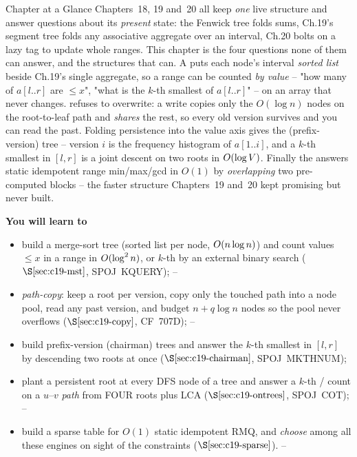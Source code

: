 \begin{chaptertheorybox}{Chapter at a Glance}
Chapters~18, 19 and~20 all keep \emph{one} live structure and answer questions
about its \emph{present} state: the Fenwick tree folds sums, Ch.19's segment
tree folds any associative aggregate over an interval, Ch.20 bolts on a lazy
tag to update whole ranges.  This chapter is the four questions none of them
can answer, and the structures that can.  A  puts each
node's interval \emph{sorted list} beside Ch.19's single aggregate, so a range
can be counted \emph{by value} -- "how many of \(a[l..r]\) are \(\le x\)",
"what is the \(k\)-th smallest of \(a[l..r]\)" -- on an array that never
changes.   refuses to overwrite: a write
copies only the \(O(\log n)\) nodes on the root-to-leaf path and \emph{shares}
the rest, so every old version survives and you can read the past.  Folding
persistence into the value axis gives the  (prefix-version) tree
-- version \(i\) is the frequency histogram of \(a[1..i]\), and a \(k\)-th
smallest in \([l,r]\) is a joint descent on two roots in \(O(\log V)\).
Finally the  answers static idempotent range min/max/gcd in
\(O(1)\) by \emph{overlapping} two pre-computed blocks -- the faster structure
Chapters~19 and~20 kept promising but never built.

\textbf{You will learn to}
\begin{itemize}[nosep]
  \item build a merge-sort tree (sorted list per node, \(O(n\log n)\)) and
        count values \(\le x\) in a range in \(O(\log^2 n)\), or \(k\)-th
        by an external binary search (\(\secref{c19-mst}\), SPOJ~KQUERY); \hfill{}--
  \item \emph{path-copy}: keep a root per version, copy only the touched path
        into a node pool, read any past version, and budget
        \(n+q\log n\) nodes so the pool never overflows
        (\(\secref{c19-copy}\), CF~707D); \hfill{}--
  \item build prefix-version (chairman) trees and answer the \(k\)-th smallest
        in \([l,r]\) by descending two roots at once (\(\secref{c19-chairman}\),
        SPOJ~MKTHNUM); \hfill{}
  \item plant a persistent root at every DFS node of a tree and answer a
        \(k\)-th / count on a \(u\)--\(v\) \emph{path} from FOUR roots plus
        LCA (\(\secref{c19-ontrees}\), SPOJ~COT); \hfill{}--
  \item build a sparse table for \(O(1)\) static idempotent RMQ, and \emph{choose}
        among all these engines on sight of the constraints
        (\(\secref{c19-sparse}\)). \hfill{}--
\end{itemize}


\end{chaptertheorybox}
